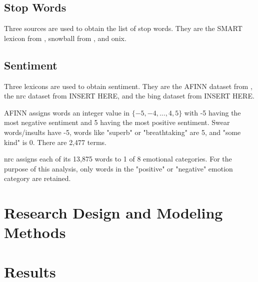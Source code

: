 \documentclass{article}
\begin{document}
\subsection{Stop Words}
Three sources are used to obtain the list of stop words. They are the SMART lexicon from \cite{Lewis2004}, snowball from \cite{snowball}, and onix.

\subsection{Sentiment}

Three lexicons are used to obtain sentiment. They are the AFINN dataset from \cite{nielsen11}, the nrc dataset from INSERT HERE, and the bing dataset from INSERT HERE.

AFINN assigns words an integer value in $\{-5, -4, ..., 4, 5\}$ with -5 having the most negative sentiment and 5 having the most positive sentiment. Swear words/insults have -5, words like "superb" or "breathtaking" are 5, and "some kind" is 0. There are 2,477 terms. 

nrc assigns each of its 13,875 words to 1 of 8 emotional categories. For the purpose of this analysis, only words in the "positive" or "negative" emotion category are retained. 






\section{Research Design and Modeling Methods}

\section{Results}
\end{document}
